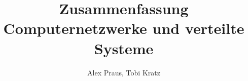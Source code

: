 \documentclass[
	ngerman,
	accentcolor=9c,%
	type=intern,
	marginpar=false
	]{tudapub}
\begin{document}
\title{Zusammenfassung Computernetzwerke und verteilte Systeme}
\author{Alex Praus, Tobi Kratz}

\maketitle

\tableofcontents








\end{document}
